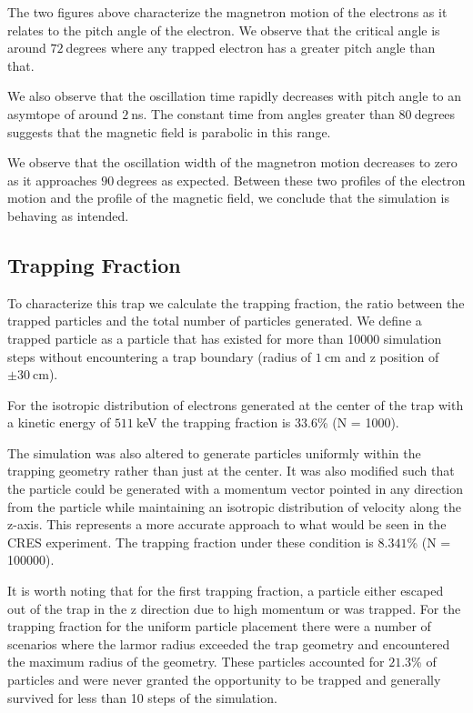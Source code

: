 \documentclass[12pt,letterpaper]{article}
\begin{document}
The two figures above characterize the magnetron motion of the electrons as it relates to the pitch angle of the electron. We observe that the critical angle is around $72~$degrees where any trapped electron has a greater pitch angle than that. 

We also observe that the oscillation time rapidly decreases with pitch angle to an asymtope of around $2~$ns. The constant time from angles greater than $80~$degrees suggests that the magnetic field is parabolic in this range.

We observe that the oscillation width of the magnetron motion decreases to zero as it approaches $90~$degrees as expected. Between these two profiles of the electron motion and the profile of the magnetic field, we conclude that the simulation is behaving as intended. 

\subsection{Trapping Fraction}

To characterize this trap we calculate the trapping fraction, the ratio between the trapped particles and the total number of particles generated. We define a trapped particle as a particle that has existed for more than 10000 simulation steps without encountering a trap boundary (radius of $1~$cm and z position of $\pm30~$cm).

For the isotropic distribution of electrons generated at the center of the trap with a kinetic energy of $511~$keV the trapping fraction is $33.6$\% (N = 1000).

The simulation was also altered to generate particles uniformly within the trapping geometry rather than just at the center. It was also modified such that the particle could be generated with a momentum vector pointed in any direction from the particle while maintaining an isotropic distribution of velocity along the z-axis. This represents a more accurate approach to what would be seen in the CRES experiment. The trapping fraction under these condition is $8.341$\% (N = 100000). 

It is worth noting that for the first trapping fraction, a particle either escaped out of the trap in the z direction due to high momentum or was trapped. For the trapping fraction for the uniform particle placement there were a number of scenarios where the larmor radius exceeded the trap geometry and encountered the maximum radius of the geometry. These particles accounted for $21.3$\% of particles and were never granted the opportunity to be trapped and generally survived for less than 10 steps of the simulation. 
\end{document}
